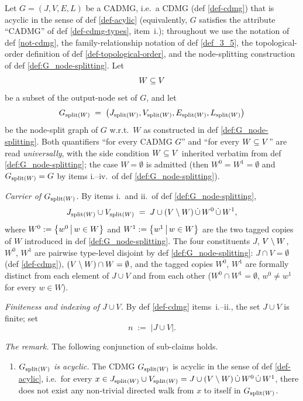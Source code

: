 \documentclass[main]{subfiles}
\begin{document}
\def\rowref{claim\_3\_6}
\label{claim_3_6}

\begin{Rem}[SplitTopologicalOrder]
    Let $G = (J, V, E, L)$ be a CADMG, i.e.\ a CDMG (def \ref{def-cdmg}) that is acyclic in the sense of def \ref{def-acylic} (equivalently, $G$ satisfies the attribute ``CADMG'' of def \ref{def-cdmg-types}, item~i.); throughout we use the notation of def \ref{not-cdmg}, the family-relationship notation of def \ref{def_3_5}, the topological-order definition of def \ref{def-topological-order}, and the node-splitting construction of def \ref{def:G_node-splitting}. Let
    \[ W \subseteq V \]
    be a subset of the output-node set of $G$, and let
    \[ G_{\mathrm{split}(W)} \;=\; \left ( J_{\mathrm{split}(W)}, V_{\mathrm{split}(W)}, E_{\mathrm{split}(W)}, L_{\mathrm{split}(W)} \right ) \]
    be the node-split graph of $G$ w.r.t.\ $W$ as constructed in def \ref{def:G_node-splitting}. Both quantifiers ``for every CADMG $G$'' and ``for every $W \subseteq V$'' are read \emph{universally}, with the side condition $W \subseteq V$ inherited verbatim from def \ref{def:G_node-splitting}; the case $W = \emptyset$ is admitted (then $W^0 = W^1 = \emptyset$ and $G_{\mathrm{split}(W)} = G$ by items i.--iv.\ of def \ref{def:G_node-splitting}).

    \emph{Carrier of $G_{\mathrm{split}(W)}$.} By items i.\ and ii.\ of def \ref{def:G_node-splitting},
    \[
        J_{\mathrm{split}(W)} \cup V_{\mathrm{split}(W)} \;=\; J \cup (V \setminus W) \,\dot{\cup}\, W^0 \,\dot{\cup}\, W^1,
    \]
    where $W^0 := \left \{ w^0 \,\middle|\, w \in W \right \}$ and $W^1 := \left \{ w^1 \,\middle|\, w \in W \right \}$ are the two tagged copies of $W$ introduced in def \ref{def:G_node-splitting}. The four constituents $J$, $V \setminus W$, $W^0$, $W^1$ are pairwise type-level disjoint by def \ref{def:G_node-splitting}: $J \cap V = \emptyset$ (def \ref{def-cdmg}), $(V \setminus W) \cap W = \emptyset$, and the tagged copies $W^0$, $W^1$ are formally distinct from each element of $J \cup V$ and from each other ($W^0 \cap W^1 = \emptyset$, $w^0 \neq w^1$ for every $w \in W$).

    \emph{Finiteness and indexing of $J \cup V$.} By def \ref{def-cdmg} items~i.--ii., the set $J \cup V$ is finite; set
    \[ n \;:=\; |J \cup V|. \]

    \emph{The remark.} The following conjunction of sub-claims holds.

    \begin{enumerate}[label=(\alph*)]
        \item \emph{$G_{\mathrm{split}(W)}$ is acyclic.}
              The CDMG $G_{\mathrm{split}(W)}$ is acyclic in the sense of def \ref{def-acylic}, i.e.\ for every $x \in J_{\mathrm{split}(W)} \cup V_{\mathrm{split}(W)} = J \cup (V \setminus W) \,\dot{\cup}\, W^0 \,\dot{\cup}\, W^1$, there does not exist any non-trivial directed walk from $x$ to itself in $G_{\mathrm{split}(W)}$.


\end{enumerate}
\end{Rem}
\end{document}
